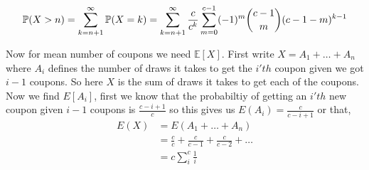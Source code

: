\documentclass[a4paper]{report}
\begin{document}
\begin{align*}
	\P(X > n) =  \sum_{k = n + 1}^{\infty} \P(X = k) = \sum_{k = n + 1}^{\infty} \frac{c}{c^{k}}	\sum_{m = 0}^{c - 1}  (-1)^{m} {c - 1 \choose m} (c - 1 - m)^{k - 1}
\end{align*}



\vspace{1em}


Now for mean number of coupons we need $\mathbb{E}[X]$. First write $X = A_{1} + \dots + A_n$ where $A_i$ defines the number of draws it takes to get the $i'th $ coupon given we got $i - 1$ coupons. So here $X$ is the sum of draws it takes to get each of the coupons. Now we find $E[A_i]$, first we know that the probabiltiy of getting an $i'th $ new coupon given $i - 1$ coupons is $\frac{c - i + 1}{c}$ so this gives us $E(A_i) = \frac{c}{c - i + 1}$ or that, 
\begin{align*}
	E(X) &= E(A_{1} + \dots + A_n)\\
	     &= \frac{c}{c} + \frac{c}{c -1} + \frac{c}{c - 2} + \dots\\
	     &= c \sum_i^{c} \frac{1}{i}\\
\end{align*}
\end{document}
